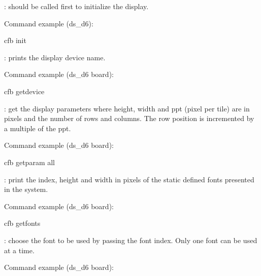 \documentclass[letterpaper,10pt,english]{sphinxmanual}
\begin{document}
: should be called first to initialize the display.

Command example (ds\_d6):

\begin{sphinxVerbatim}[commandchars=\\\{\}]
 cfb init
\end{sphinxVerbatim}

: prints the display device name.

Command example (ds\_d6 board):

\begin{sphinxVerbatim}[commandchars=\\\{\}]
 cfb get\PYGZus{}device
\end{sphinxVerbatim}

: get the display parameters where height, width and ppt
(pixel per tile) are in pixels and the number of rows and columns. The row
position is incremented by a multiple of the ppt.

Command example (ds\_d6 board):

\begin{sphinxVerbatim}[commandchars=\\\{\}]
 cfb get\PYGZus{}param all
\end{sphinxVerbatim}

: print the index, height and width in pixels of the static
defined fonts presented in the system.

Command example (ds\_d6 board):

\begin{sphinxVerbatim}[commandchars=\\\{\}]
 cfb get\PYGZus{}fonts
\end{sphinxVerbatim}

: choose the font to be used by passing the font index. Only one
font can be used at a time.

Command example (ds\_d6 board):
\end{document}
